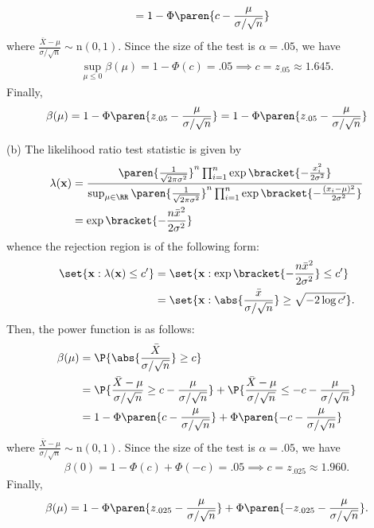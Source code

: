 \documentclass{homework}
\begin{document}
{\begin{align*}
        \\ &= 1-\Phi\paren{ c - \frac{\mu}{\sigma/\sqrt n} }
    \end{align*}
    where $\frac{\bar X - \mu}{\sigma/\sqrt n}\sim \mathrm n(0,1)$. Since the size of the test is $\alpha = .05$, we have
    \begin{align*}
        \sup_{\mu\le 0}\beta(\mu) = 1-\Phi(c) = .05\implies c = z_{.05} \approx 1.645.
    \end{align*}
    Finally,
    \begin{align*}
        \beta(\mu) = 1-\Phi\paren{ z_{.05} - \frac{\mu}{\sigma/\sqrt n} }= 1 - \Phi\paren{z_{.05} - \frac{\mu}{\sigma/\sqrt n}}
    \end{align*}

    \noindent(b) The likelihood ratio test statistic is given by
    \begin{align*}
        \lambda(\mathbf{x}) & = \frac{\paren{\frac 1 {\sqrt{2\pi \sigma^2}}}^n \prod_{i=1}^n \exp\bracket{-\frac{x_i^2}{2\sigma^2}} }{\sup_{\mu\in\RR} \paren{\frac 1 {\sqrt{2\pi \sigma^2}}}^n \prod_{i=1}^n \exp\bracket{-\frac{(x_i - \mu)^2}{2\sigma^2}} }
        \\ &= \exp\bracket{-\frac{n\bar x^2}{2\sigma^2}}
    \end{align*}
    whence the rejection region is of the following form:
    \begin{align*}
        \set{\mathbf x:\lambda(\mathbf x) \le c'} & = \set{\mathbf x:\exp\bracket{-\frac{n\bar x^2}{2\sigma^2}} \le c'}
        \\ &= \set{\mathbf x:\abs{\frac{\bar x}{\sigma/\sqrt n}} \ge \sqrt{-2\log c'}}.
    \end{align*}
    Then, the power function is as follows:
    \begin{align*}
        \beta(\mu) & = \P{ \abs{\frac{\bar X}{\sigma/\sqrt n}} \ge  c }
        \\ &= \P{ \frac{\bar X-\mu}{\sigma/\sqrt n} \ge  c-\frac{\mu}{\sigma/\sqrt n} } + \P{ \frac{\bar X-\mu}{\sigma/\sqrt n} \le  -c-\frac{\mu}{\sigma/\sqrt n} }
        \\ &= 1-\Phi\paren{c-\frac{\mu}{\sigma/\sqrt n} } + \Phi\paren{ -c-\frac{\mu}{\sigma/\sqrt n} }
    \end{align*}
    where $\frac{\bar X - \mu}{\sigma/\sqrt n}\sim \mathrm n(0,1)$. Since the size of the test is $\alpha = .05$, we have
    \begin{align*}
        \beta(0) = 1-\Phi(c) + \Phi(-c) = .05\implies c = z_{.025} \approx 1.960.
    \end{align*}
    Finally,
    \[ \beta(\mu) = 1-\Phi\paren{ z_{.025} -\frac{\mu}{\sigma/\sqrt n} } + \Phi\paren{ - z_{.025} -\frac{\mu}{\sigma/\sqrt n} }.\]
}
\end{document}
